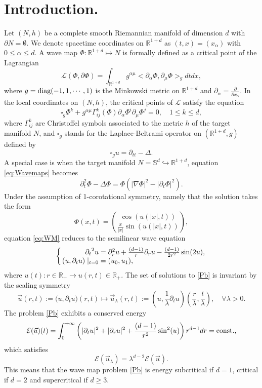 \documentclass[11pt]{aims}
\theoremstyle{definition}
\numberwithin{equation}{section}
\begin{document}
\section{Introduction.} 
Let $(N,h)$ be a complete smooth Riemannian manifold of dimension $d$ with ${\partial} N=\emptyset$. We denote spacetime coordinates on ${\mathbb{R}}^{1 + d}$ as $(t,x) = (x_\alpha)$ with $0 \leq \alpha \leq d$. A wave map $\Phi : {\mathbb{R}}^{1+d} \mapsto N$ is formally defined as a critical point of the Lagrangian 
$$\mathcal{L}(\Phi,{\partial} \Phi)=\int_{{\mathbb{R}}^{1 + d}}g^{\alpha\mu}\Big<{\partial}_\alpha \Phi,{\partial}_\mu \Phi\Big>_g dtdx,$$
where $g = \textup{diag}(-1, 1, \cdots, 1)$ is the Minkowski metric on ${\mathbb{R}}^{1 + d}$ and ${\partial}_\alpha = \frac{\partial}{{\partial} x_\alpha}$. In the local coordinates on $(N,h)$, the critical points of $\mathcal{L}$ satisfy the equation
\begin{equation}\label{eq:Wavemaps}
\square_g \Phi^k+g^{\alpha\mu}\Gamma^k_{ij}(\Phi){\partial}_\alpha \Phi^i{\partial}_\mu \Phi^j=0, \quad 1 \leq k \leq d,
\end{equation}
where $\Gamma^k_{ij}$ are Christoffel symbols associated to the metric $h$ of the target manifold $N$, and $\square_g$ stands for the Laplace-Beltrami operator on $({\mathbb{R}}^{1 + d},g)$ defined by 
$$
\square_g u = {\partial}_{tt} - \Delta.
$$
A special case is when the target manifold $N = {\mathbb{S}}^d \hookrightarrow {\mathbb{R}}^{1 + d}$, equation \eqref{eq:Wavemaps} becomes
\begin{equation}\label{eq:WM}
\partial_{t}^2\Phi - \Delta \Phi = \Phi(|\nabla \Phi|^2 - |{\partial_t} \Phi|^2).
\end{equation}
Under the assumption of 1-corotational symmetry, namely that the solution takes the form
$$\Phi(x,t) = \binom{\cos(u(|x|,t))}{\frac{x}{|x|}\sin(u(|x|,t))},$$ 
equation \eqref{eq:WM} reduces to the semilinear wave equation 
 \begin{equation}\label{Pb}
 \arraycolsep=1.4pt
\left\{\begin{array}{rl}
{\partial_t}^2 u &= \partial^2_r u + \frac{(d-1)}{r}\partial_r u - \frac{(d-1)}{2r^2}\sin(2u),\\
(u,{\partial_t} u)\mid_{t = 0} &= (u_0, u_1),
\end{array}\right.
\end{equation}
where $u(t): r \in {\mathbb{R}}_+ \to u(r,t) \in {\mathbb{R}}_+$. The set of solutions to \eqref{Pb} is invariant by the scaling symmetry
$$\vec u(r,t) := \big(u, {\partial_t} u\big)(r,t) \longmapsto \vec u_\lambda(r,t):=\left(u, \frac{1}{\lambda}{\partial_t} u\right)\left(\frac{r}{\lambda}, \frac{t}{\lambda} \right), \quad \forall\lambda > 0.$$
The problem  \eqref{Pb} exhibits a conserved energy 
\begin{equation}\label{def:Enut}
{\mathcal{E}}(\vec u)(t) = \int_0^{+\infty} \left( |{\partial_t} u|^2 + |\partial_r u|^2 + \frac{(d-1)}{r^2}\sin^2(u)\right)r^{d-1}dr = \textup{const.},
\end{equation}
which satisfies
$${\mathcal{E}}(\vec u_\lambda) = \lambda^{d-2}{\mathcal{E}}(\vec u).$$
This means that the wave map problem \eqref{Pb} is energy subcritical if $d = 1$, critical if $d =2$ and supercritical if $d \geq 3$.
\end{document}
